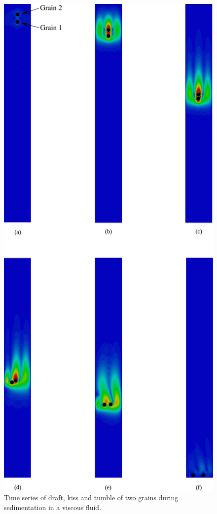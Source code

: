 \begin{figure}[tbhp]
\centering
\includegraphics[height=0.9\textheight]{kissing}
\caption{Time series of draft, kiss and tumble of two grains 
during 
sedimentation in a viscous fluid.}
\label{fig:kissing}
\end{figure}

